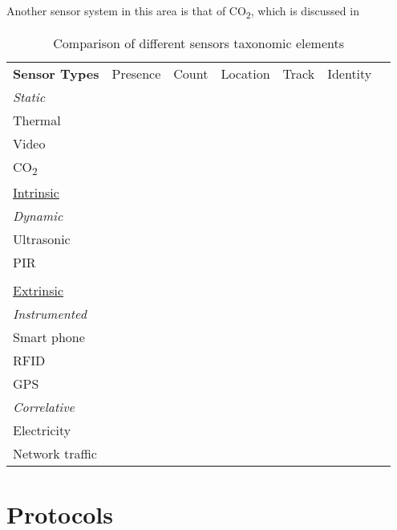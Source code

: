 \documentclass[../thesis/thesis.tex]{subfiles}
\begin{document}
Another sensor system in this area is that of CO\textsubscript{2}, which is discussed in \cite{fisk2006accuracy}

\begin{table}
\begin{tabular}{l|c*{5}{c}}
\textbf{Sensor Types}  			& Presence & Count & Location & Track & Identity \\
\cline{2-6}

\hspace{3mm}\textit{Static} 		& \\
\hspace{6mm}Thermal 			& \checkmark & \checkmark & \checkmark &  &  \\
\hspace{6mm}Video			& \checkmark & \checkmark & \checkmark & \checkmark & \checkmark \\
\hspace{6mm}CO\textsubscript{2}		& \checkmark & \checkmark &  &  &  \\

\underline{Intrinsic} 			& \\
\hspace{3mm}\textit{Dynamic} 		& \\
\hspace{6mm}Ultrasonic	 		& \checkmark & \checkmark &  & \checkmark & \checkmark \\
\hspace{6mm}PIR		 		& \checkmark &  &  &  &  \\

& \\

\underline{Extrinsic}			& \\
\hspace{3mm}\textit{Instrumented} 	& \\
\hspace{6mm}Smart phone			& \checkmark & \checkmark & & \checkmark & \checkmark \\
\hspace{6mm}RFID 			& \checkmark & \checkmark & & \checkmark & \\
\hspace{6mm}GPS 			& \checkmark & & & \checkmark & \\

\hspace{3mm}\textit{Correlative} 	& \\
\hspace{6mm}Electricity 		& \checkmark & & & & & \\
\hspace{6mm}Network traffic		& \checkmark & & & & & \\

\end{tabular}
\caption{Comparison of different sensors taxonomic elements}
\end{table}

\section{Protocols}


\end{document}
